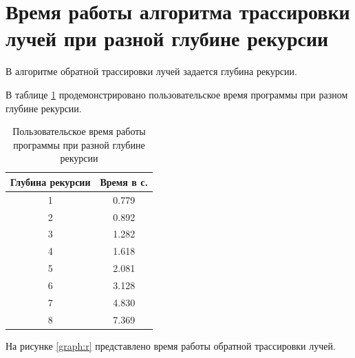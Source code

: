 \begin{figure}[ht!]
\end{figure}

\section{Время работы алгоритма трассировки лучей при разной глубине рекурсии}

В алгоритме обратной трассировки лучей задается глубина рекурсии.

В таблице \ref{tab:time1} продемонстрировано пользовательское время программы при разном глубине рекурсии.

\begin{table}[ht!]
	\begin{center}
		
		\caption{Пользовательское время работы программы при разной глубине рекурсии}
		\label{tab:time1}
		\begin{tabular}{|c|c|}
			\hline
			Глубина рекурсии & Время в с. \\
			\hline
			1  & 0.779 \\
			\hline
			2  & 0.892 \\
			\hline
			3  & 1.282 \\
			\hline
			4  & 1.618 \\
			\hline
			5  & 2.081 \\
			\hline
			6  & 3.128\\
			\hline
			7  & 4.830\\
			\hline
			8  & 7.369\\
			\hline
			
		\end{tabular}
	\end{center}
\end{table}
\newpage
На рисунке \ref{graph:r} представлено время работы обратной трассировки лучей.

